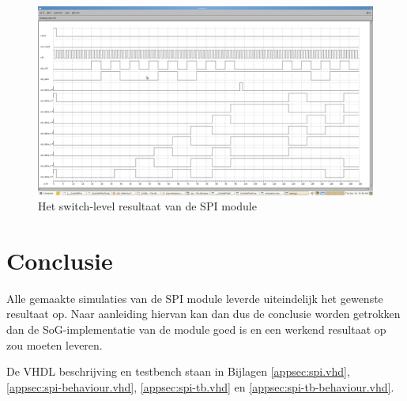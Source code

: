 \documentclass{scrartcl} %
\begin{document}
\begin{figure}[H]
	\centering
	\includegraphics[width=\textwidth]{resource/switchlevelSPI.png}
	\caption{Het switch-level resultaat van de SPI module}
	\label{fig:spi-sls}
\end{figure}

\section{Conclusie}
Alle gemaakte simulaties van de SPI module leverde uiteindelijk het gewenste resultaat op.
Naar aanleiding hiervan kan dan dus de conclusie worden getrokken dan de SoG-implementatie van de module goed is en een werkend resultaat op zou moeten leveren.

De VHDL beschrijving en testbench staan in Bijlagen \ref{appsec:spi.vhd}, \ref{appsec:spi-behaviour.vhd}, \ref{appsec:spi-tb.vhd} en \ref{appsec:spi-tb-behaviour.vhd}.
\end{document}
